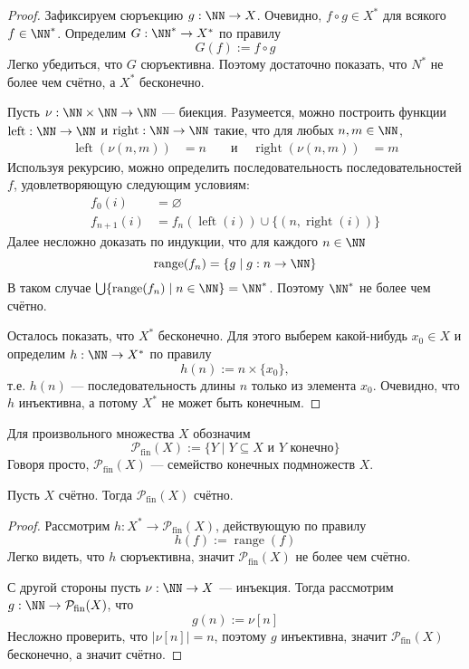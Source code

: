 \documentclass[12pt,a4paper]{article}
\newcommand{\finsubsets}{\ensuremath{\mathcal{P_{\mathrm{fin}}}}\xspace}
\DeclareMathOperator{\range}{range}
\DeclareMathOperator{\Left}{left}
\DeclareMathOperator{\Right}{right}
\begin{document}
    \begin{proof}
        Зафиксируем сюръекцию $g: \NN \to X$. Очевидно, $f \circ g \in X^*$ для всякого $f \in \NN^*$. Определим $G: \NN^* \to X^*$ по правилу
        \[G(f) := f \circ g\]
        Легко убедиться, что $G$ сюръективна. Поэтому достаточно показать, что $N^*$ не более чем счётно, а $X^*$ бесконечно.

        Пусть $\nu: \NN \times \NN \to \NN$ --- биекция. Разумеется, можно построить функции $\Left: \NN \to \NN$ и $\Right: \NN \to \NN$ такие, что для любых $n, m \in \NN$,
        \begin{align*}
            \Left(\nu(n,m)) &= n&
            &\text{ и }&
            \Right(\nu(n,m)) &= m
        \end{align*}
        Используя рекурсию, можно определить последовательность последовательностей $f$, удовлетворяющую следующим условиям:
        \begin{align*}
            f_0(i) &= \varnothing\\
            f_{n+1}(i) &= f_n(\Left(i)) \cup \{(n, \Right(i))\}
        \end{align*}
        Далее несложно доказать по индукции, что для каждого $n \in \NN$
        \[\range(f_n) = \{g \mid g: n \to \NN\}\]
        В таком случае $\bigcup \{\range(f_n) \mid n \in \NN\} = \NN^*$. Поэтому $\NN^*$ не более чем счётно.

        Осталось показать, что $X^*$ бесконечно. Для этого выберем какой-нибудь $x_0 \in X$ и определим $h: \NN \to X^*$ по правилу
        \[h(n) := n \times \{x_0\},\]
        т.е. $h(n)$ --- последовательность длины $n$ только из элемента $x_0$. Очевидно, что $h$ инъективна, а потому $X^*$ не может быть конечным.
    \end{proof}

    \begin{definition}
        Для произвольного множества $X$ обозначим
        \[\finsubsets(X) := \{Y \mid Y \subseteq X \text{ и $Y$ конечно}\}\]
        Говоря просто, $\finsubsets(X)$ --- семейство конечных подмножеств $X$.
    \end{definition}

    \begin{corollary}
        Пусть $X$ счётно. Тогда $\finsubsets(X)$ счётно.
    \end{corollary}

    \begin{proof}
        Рассмотрим $h: X^* \to \finsubsets(X)$, действующую по правилу
        \[h(f) := \range(f)\]
        Легко видеть, что $h$ сюръективна, значит $\finsubsets(X)$ не более чем счётно.

        С другой стороны пусть $\nu: \NN \to X$ --- инъекция. Тогда рассмотрим $g: \NN \to \finsubsets(X)$, что
        \[g(n) := \nu[n]\]
        Несложно проверить, что $|\nu[n]| = n$, поэтому $g$ инъективна, значит $\finsubsets(X)$ бесконечно, а значит счётно.
    \end{proof}
\end{document}

